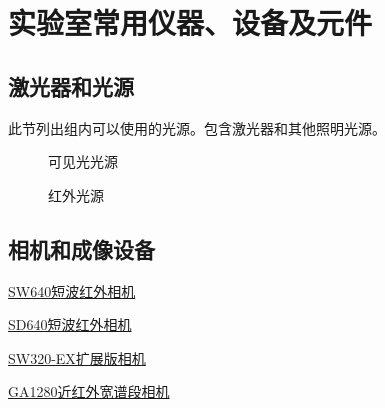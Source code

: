 \documentclass[cn,11pt,chinese]{elegantbook}
\begin{document}
\chapter{实验室常用仪器、设备及元件}
\section{激光器和光源}
此节列出组内可以使用的光源。包含激光器和其他照明光源。
\begin{figure}[ht]
	\centering
	 \quad
	 \quad
	\caption{可见光光源} 
	\label{fig:source:visible}
\end{figure}

\begin{figure}[ht]
	\centering
	 \quad
	 \quad
   \quad
   \quad
	\caption{红外光源} 
	\label{fig:source:NIR}
\end{figure}
\section{相机和成像设备}
\begin{introduction}[相机快速跳转]
  \item \hyperlink{txt:SW640}{SW640短波红外相机}
  \item \hyperlink{txt:SD640}{SD640短波红外相机}
  \item \hyperlink{txt:SW320}{SW320-EX扩展版相机}
  \item \hyperlink{txt:GA1280}{GA1280近红外宽谱段相机}
\end{introduction}
\end{document}
